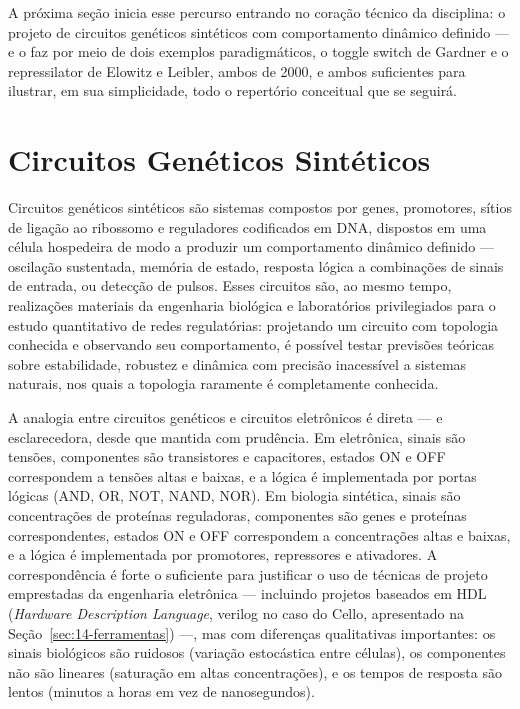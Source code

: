 A próxima seção inicia esse percurso entrando no coração técnico da disciplina: o projeto de circuitos genéticos sintéticos com comportamento dinâmico definido --- e o faz por meio de dois exemplos paradigmáticos, o toggle switch de Gardner e o repressilator de Elowitz e Leibler, ambos de 2000, e ambos suficientes para ilustrar, em sua simplicidade, todo o repertório conceitual que se seguirá.



\section{Circuitos Genéticos Sintéticos}
\label{sec:14-circuitos}

Circuitos genéticos sintéticos são sistemas compostos por genes, promotores, sítios de ligação ao ribossomo e reguladores codificados em DNA, dispostos em uma célula hospedeira de modo a produzir um comportamento dinâmico definido --- oscilação sustentada, memória de estado, resposta lógica a combinações de sinais de entrada, ou detecção de pulsos. Esses circuitos são, ao mesmo tempo, realizações materiais da engenharia biológica e laboratórios privilegiados para o estudo quantitativo de redes regulatórias: projetando um circuito com topologia conhecida e observando seu comportamento, é possível testar previsões teóricas sobre estabilidade, robustez e dinâmica com precisão inacessível a sistemas naturais, nos quais a topologia raramente é completamente conhecida.

A analogia entre circuitos genéticos e circuitos eletrônicos é direta --- e esclarecedora, desde que mantida com prudência. Em eletrônica, sinais são tensões, componentes são transistores e capacitores, estados ON e OFF correspondem a tensões altas e baixas, e a lógica é implementada por portas lógicas (AND, OR, NOT, NAND, NOR). Em biologia sintética, sinais são concentrações de proteínas reguladoras, componentes são genes e proteínas correspondentes, estados ON e OFF correspondem a concentrações altas e baixas, e a lógica é implementada por promotores, repressores e ativadores. A correspondência é forte o suficiente para justificar o uso de técnicas de projeto emprestadas da engenharia eletrônica --- incluindo projetos baseados em HDL (\emph{Hardware Description Language}, verilog no caso do Cello, apresentado na Seção~\ref{sec:14-ferramentas}) ---, mas com diferenças qualitativas importantes: os sinais biológicos são ruidosos (variação estocástica entre células), os componentes não são lineares (saturação em altas concentrações), e os tempos de resposta são lentos (minutos a horas em vez de nanosegundos).

